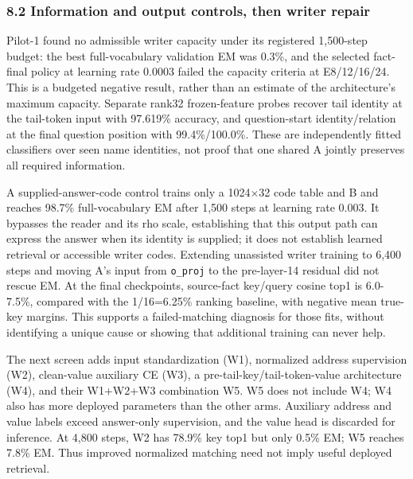 \subsubsection*{8.2 Information and output controls, then writer repair}

Pilot-1 found no admissible writer capacity under its registered 1,500-step
budget: the best full-vocabulary validation EM was 0.3\%, and the selected
fact-final policy at learning rate 0.0003 failed the capacity criteria at
E8/\allowbreak{}12/\allowbreak{}16/\allowbreak{}24. This is a budgeted negative result, rather than an  %
estimate of the architecture’s maximum capacity. Separate rank32  %
frozen-feature probes recover tail identity at the tail-token input with 97.619\%
accuracy, and question-start identity/\allowbreak{}relation at the final question position
with 99.4\%/\allowbreak{}100.0\%. These are independently fitted classifiers over  %
seen name identities, not proof that one shared A jointly preserves all required
information.  %

A supplied-answer-code control trains only a 1024\ensuremath{\times}32 code table and B and reaches
98.7\% full-vocabulary EM after 1,500 steps at learning rate 0.003. It  %
bypasses the reader and its rho scale, establishing that this output path can
express the answer when its identity is supplied; it does not establish learned
retrieval or accessible writer codes. Extending unassisted writer  %
training to 6,400 steps and moving A’s input from \texttt{o\_proj} to the pre-layer-14
residual did not rescue EM. At the final checkpoints, source-fact  %
key/\allowbreak{}query cosine top1 is 6.0-7.5\%, compared with the 1/\allowbreak{}16=6.25\% ranking baseline,
with negative mean true-key margins. This supports a failed-matching  %
diagnosis for those fits, without identifying a unique cause or showing that
additional training can never help.  %

The next screen adds input standardization (W1), normalized address supervision
(W2), clean-value auxiliary CE (W3), a pre-tail-key/\allowbreak{}tail-token-value architecture
(W4), and their W1+W2+W3 combination W5. W5 does not include W4;  %
W4 also has more deployed parameters than the other arms. Auxiliary  %
address and value labels exceed answer-only supervision, and the value head is
discarded for inference. At 4,800 steps, W2 has 78.9\% key top1 but  %
only 0.5\% EM; W5 reaches 7.8\% EM. Thus improved normalized matching  %
need not imply useful deployed retrieval.  %

